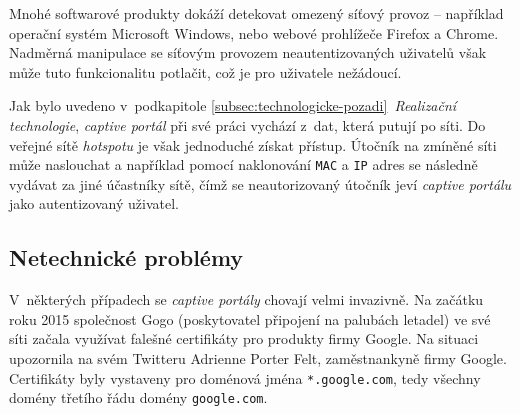 \documentclass[thesis=M,czech]{FITthesis}[2012/10/20]
\begin{document}

Mnohé softwarové produkty dokáží detekovat omezený síťový provoz -- například operační systém Microsoft Windows, nebo webové prohlížeče Firefox a Chrome. Nadměrná manipulace se síťovým provozem neautentizovaných uživatelů však může tuto funkcionalitu potlačit, což je pro uživatele nežádoucí.




Jak bylo uvedeno v~podkapitole \ref{subsec:technologicke-pozadi}~\textit{Realizační technologie}, \textit{captive portál} při své práci vychází z~dat, která putují po síti. Do veřejné sítě \textit{hotspotu} je však jednoduché získat přístup. Útočník na zmíněné síti může naslouchat a například pomocí naklonování \texttt{MAC} a \texttt{IP} adres se následně vydávat za jiné účastníky sítě, čímž se neautorizovaný útočník jeví \textit{captive portálu} jako autentizovaný uživatel.


% 





\subsection{Netechnické problémy}
\label{subsec:netechnicke-problemy}

V~některých případech se \textit{captive portály} chovají velmi invazivně. Na začátku roku 2015 společnost Gogo (poskytovatel připojení na palubách letadel) ve své síti začala využívat falešné certifikáty pro produkty firmy Google. Na situaci upozornila na svém Twitteru\cite{gogo-fakecerts} Adrienne Porter Felt, zaměstnankyně firmy Google. Certifikáty byly vystaveny pro doménová jména \texttt{*.google.com}, tedy všechny domény třetího řádu domény \texttt{google.com}.
\end{document}
